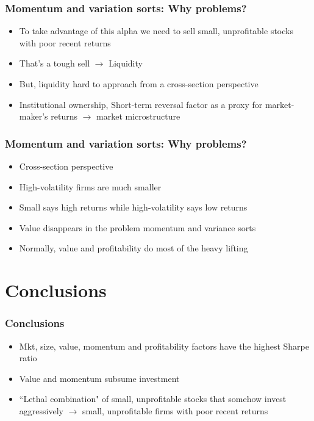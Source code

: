 \documentclass{beamer}
\begin{document}
\begin{frame}
\frametitle{Momentum and variation sorts: Why problems?}
\begin{itemize}
    \item<1-> To take advantage of this alpha we need to sell small,
    unprofitable stocks with poor recent returns
    \item<2-> That's a tough sell $\rightarrow$ Liquidity
    \item<3-> But, liquidity hard to approach from a cross-section perspective
    \item<3-> Institutional ownership, Short-term reversal factor as a proxy
    for market-maker's returns $\rightarrow$ market microstructure
\end{itemize}
\end{frame}

\begin{frame}
\frametitle{Momentum and variation sorts: Why problems?}
\begin{itemize}
    \item<1-> Cross-section perspective
    \item<1-> High-volatility firms are much smaller
    \item<1-> Small says high returns while high-volatility says low returns
    \item<2-> Value disappears in the problem momentum and variance sorts
    \item<2-> Normally, value and profitability do most of the heavy lifting
\end{itemize}
\end{frame}

\section{Conclusions}

\begin{frame}
\frametitle{Conclusions}
\begin{itemize}
    \item<1-> Mkt, size, value, momentum and profitability factors have the
    highest Sharpe ratio
    \item<2-> Value and momentum subsume investment
    \item<3-> ``Lethal combination" of small, unprofitable stocks that somehow
    invest aggressively $\rightarrow$ small, unprofitable firms with poor
    recent returns
\end{itemize}
\end{frame}
\end{document}

